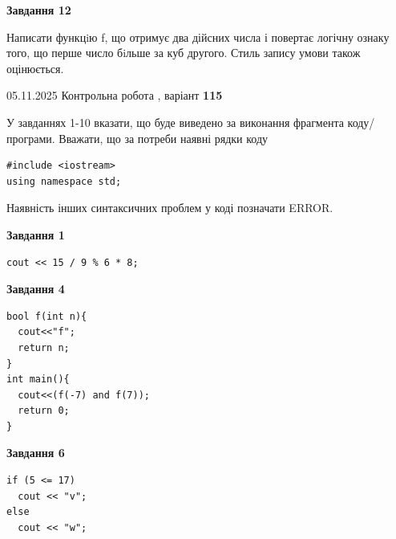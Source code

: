 \documentclass[12pt, ukrainian]{article}
\begin{document}
{\begin {large}
\begin{minipage}[t]{11.0cm}
\begin{center}
\textbf{Завдання 12}
\end{center}

Написати функцiю f, що отримує два дійсних числа і повертає логічну ознаку того, що перше число бiльше за куб другого. Стиль запису умови також оцінюється.\par

\end{minipage}

\end {large}}
\newpage

{\Large{05.11.2025 Контрольна робота , варіант  \No \textbf { 115 }\par}}
{
\begin {large}
У завданнях 1-10 вказати, що буде виведено за виконання фрагмента коду/про\-гра\-ми.
Вважати, що за потреби наявні рядки коду
\begin{verbatim}
#include <iostream>
using namespace std;
\end{verbatim}
Наявність інших синтаксичних проблем у коді позначати ERROR.

\begin{minipage}[t]{7.0cm}

\begin{center}
\textbf{Завдання 1}
\end{center}
\vspace{-8mm}

\begin{verbatim}
cout << 15 / 9 % 6 * 8;
\end{verbatim}



\begin{center}
\textbf{Завдання 4}
\end{center}
\vspace{-8mm}

\begin{verbatim}
bool f(int n){
  cout<<"f";
  return n;
}
int main(){
  cout<<(f(-7) and f(7));
  return 0;
}
\end{verbatim}



\begin{center}
\textbf{Завдання 6}
\end{center}
\vspace{-8mm}

\begin{verbatim}
if (5 <= 17)
  cout << "v";
else
  cout << "w";
\end{verbatim}




\end{minipage}
\end{large}}
\end{document}
